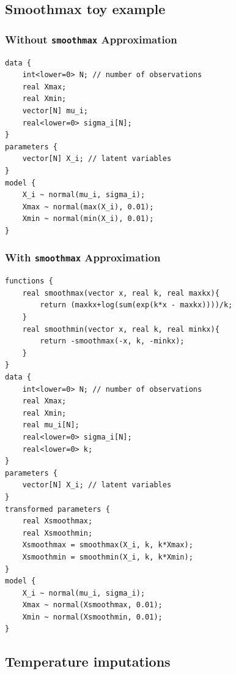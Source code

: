 \documentclass[letter]{article}
\begin{document}
\subsection{Smoothmax toy example}\label{smoothmax-toy-example}
    

\label{sec:stan_illustration}
        \subsubsection{\texorpdfstring{Without \texttt{smoothmax} Approximation}{Without smoothmax Approximation}}\label{without-smoothmax-approximation}
    


        \begin{verbatim}
data {
    int<lower=0> N; // number of observations
    real Xmax;
    real Xmin;
    vector[N] mu_i;
    real<lower=0> sigma_i[N];
}
parameters {
    vector[N] X_i; // latent variables
}
model {
    X_i ~ normal(mu_i, sigma_i);
    Xmax ~ normal(max(X_i), 0.01);
    Xmin ~ normal(min(X_i), 0.01);
}
\end{verbatim}
    


        \subsubsection{\texorpdfstring{With \texttt{smoothmax} Approximation}{With smoothmax Approximation}}\label{with-smoothmax-approximation}
    


        \begin{verbatim}
functions {
    real smoothmax(vector x, real k, real maxkx){
        return (maxkx+log(sum(exp(k*x - maxkx))))/k;
    }
    real smoothmin(vector x, real k, real minkx){
        return -smoothmax(-x, k, -minkx);
    }
}
data {
    int<lower=0> N; // number of observations
    real Xmax;
    real Xmin;
    real mu_i[N];
    real<lower=0> sigma_i[N];
    real<lower=0> k;
}
parameters {
    vector[N] X_i; // latent variables
}
transformed parameters {
    real Xsmoothmax;
    real Xsmoothmin;
    Xsmoothmax = smoothmax(X_i, k, k*Xmax);
    Xsmoothmin = smoothmin(X_i, k, k*Xmin);
}
model {
    X_i ~ normal(mu_i, sigma_i);
    Xmax ~ normal(Xsmoothmax, 0.01);
    Xmin ~ normal(Xsmoothmin, 0.01);
}
\end{verbatim}
    


        \subsection{Temperature imputations}\label{temperature-imputations}
    
\end{document}
